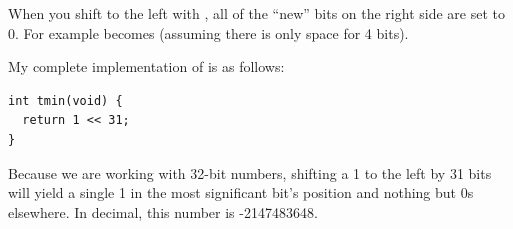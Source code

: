When you shift to the left with \code{<<}, all of the ``new'' bits on the right side are set to 0. For example  becomes  (assuming there is only space for 4 bits).

My complete implementation of  is as follows:

\begin{verbatim}
int tmin(void) {
  return 1 << 31;
}
\end{verbatim}

Because we are working with 32-bit numbers, shifting a 1 to the left by 31 bits will yield a single 1 in the most significant bit's position and nothing but 0s elsewhere. In decimal, this number is -2147483648.

